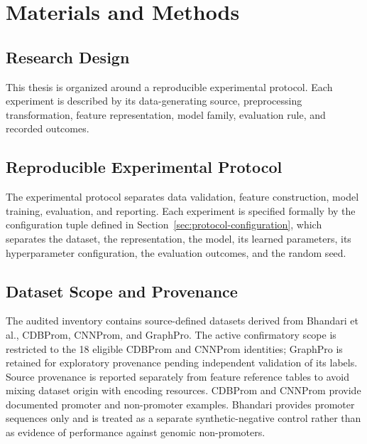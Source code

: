 \chapter{Materials and Methods}\label{chap:materials-methods}

\section{Research Design}\label{sec:methods-research-design}

This thesis is organized around a reproducible experimental protocol. Each experiment is described by its data-generating source, preprocessing transformation, feature representation, model family, evaluation rule, and recorded outcomes.



\section{Reproducible Experimental Protocol}\label{sec:methods-protocol-overview}

The experimental protocol separates data validation, feature construction, model training, evaluation, and reporting. Each experiment is specified formally by the configuration tuple defined in Section~\ref{sec:protocol-configuration}, which separates the dataset, the representation, the model, its learned parameters, its hyperparameter configuration, the evaluation outcomes, and the random seed.

\section{Dataset Scope and Provenance}\label{sec:methods-dataset-scope}

The audited inventory contains source-defined datasets derived from Bhandari et
al., CDBProm, CNNProm, and GraphPro. The active confirmatory scope is restricted
to the 18 eligible CDBProm and CNNProm identities; GraphPro is retained for
exploratory provenance pending independent validation of its labels. Source provenance is reported
separately from feature reference tables to avoid mixing dataset origin with
encoding resources. CDBProm and CNNProm provide documented promoter and
non-promoter examples. Bhandari provides promoter sequences only and is treated
as a separate synthetic-negative control rather than as evidence of performance
against genomic non-promoters.


